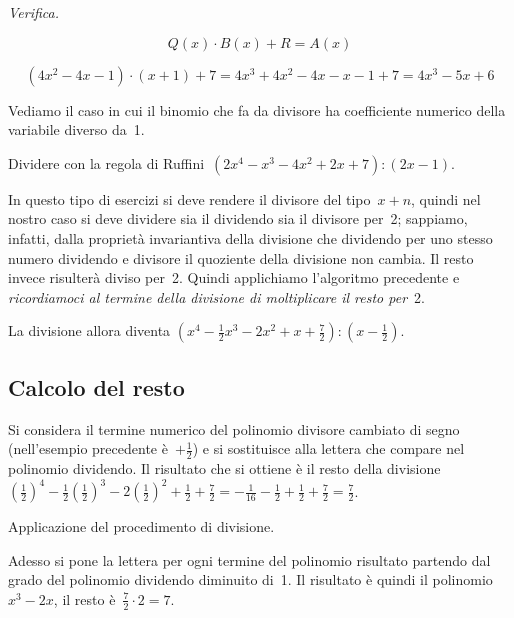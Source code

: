 \begin{exrig}
\textit{Verifica.}

\[Q(x)\cdot B(x)+R=A(x)\]

\[\left(4x^{2}-4x-1\right)\cdot (x+1)+7=4x^{3}+4x^{2}-4x-x-1+7=4x^{3}-5x+6\]

Vediamo il caso in cui il binomio che fa da divisore ha coefficiente
numerico della variabile diverso da~1.


\begin{esempio}
 Dividere con la regola di Ruffini~$\left(2x^{4}-x^{3}-4x^{2}+2x+7\right):(2x-1)$.

In questo tipo di esercizi si deve rendere il divisore del tipo~$x+n$,
quindi nel nostro caso si deve dividere sia il dividendo sia il
divisore per~2; sappiamo, infatti, dalla proprietà invariantiva della
divisione che dividendo per uno stesso numero dividendo e divisore il
quoziente della divisione non cambia. Il resto invece risulterà
diviso per~2. Quindi applichiamo l'algoritmo precedente
e \emph{ricordiamoci al termine della divisione di moltiplicare il
resto per}~2.

La divisione allora diventa
$\left(x^{4}-\frac{1}{2}x^{3}-2x^{2}+x+\frac{7}{2}\right):\left(x-\frac{1}{2}\right)$.
\end{esempio}
\end{exrig}

\ovalbox{\risolvii \ref{ese:12.8}, \ref{ese:12.9}, \ref{ese:12.10}, \ref{ese:12.11}, \ref{ese:12.12}}

\subsection{Calcolo del resto}

Si considera il termine numerico del polinomio divisore cambiato di
segno (nell'esempio precedente è~$+{\frac{1}{2}}$) e si
sostituisce alla lettera che compare nel polinomio dividendo. Il risultato che si
ottiene è il resto della
divisione~$\left(\frac{1}{2}\right)^{4}-\frac{1}{2}\left(\frac{1}{2}\right)^{3}-2\left(\frac{1}{2}\right)^{2}+\frac{1}{2}+\frac{7}{2}=-\frac{1}{16}-\frac{1}{2}+\frac{1}{2}+\frac{7}{2}=\frac{7}{2}$.

Applicazione del procedimento di divisione.
\begin{center}
 
\end{center}

Adesso si pone la lettera per ogni termine del polinomio risultato
partendo dal grado del polinomio dividendo diminuito di~1. Il risultato
è quindi il polinomio~$x^{3}-2x$, il resto è~$\frac{7}{2}\cdot2=7$.

